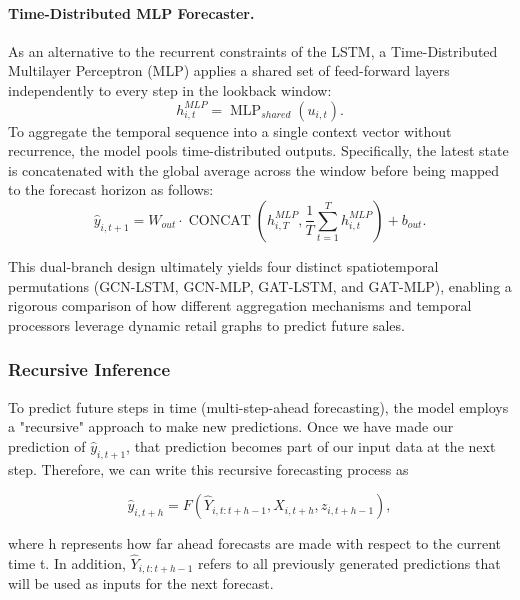 \paragraph{Time-Distributed MLP Forecaster.}
As an alternative to the recurrent constraints of the LSTM, a Time-Distributed Multilayer Perceptron (MLP) applies a shared set of feed-forward layers independently to every step in the lookback window:
\begin{equation}
    h_{i,t}^{MLP} =
    \operatorname{MLP}_{shared}
    \left(
        u_{i,t}
    \right).
    \label{eq:mlp_timestep}
\end{equation}
To aggregate the temporal sequence into a single context vector without recurrence, the model pools time-distributed outputs. Specifically, the latest state is concatenated with the global average across the window before being mapped to the forecast horizon as follows:
\begin{equation}
    \hat{y}_{i,t+1} =
    W_{out} \cdot 
    \operatorname{CONCAT}
    \left(
        h_{i,T}^{MLP}, 
        \frac{1}{T}\sum_{t=1}^{T} h_{i,t}^{MLP}
    \right)
    + b_{out}.
    \label{eq:mlp_output_prediction}
\end{equation}

This dual-branch design ultimately yields four distinct spatiotemporal permutations (GCN-LSTM, GCN-MLP, GAT-LSTM, and GAT-MLP), enabling a rigorous comparison of how different aggregation mechanisms and temporal processors leverage dynamic retail graphs to predict future sales.

\subsubsection{Recursive Inference}
\label{subsubsec:recursive_inference}

To predict future steps in time (multi-step-ahead forecasting), the model employs a "recursive" approach to make new predictions. Once we have made our prediction of \(\hat{y}_{i,t+1}\), that prediction becomes part of our input data at the next step. Therefore, we can write this recursive forecasting process as

\begin{equation}
\hat{y}_{i,t+h} = 
F\left( \hat{Y}_{i,t:t+h-1}, 
X_{i,t+h},
z_{i,t+h-1} \right)
, \label{eq:recursive_forecasting}
\end{equation}

where h represents how far ahead forecasts are made with respect to the current time t. In addition, \(\hat{Y}_{i,t:t+h-1}\) refers to all previously generated predictions that will be used as inputs for the next forecast.

